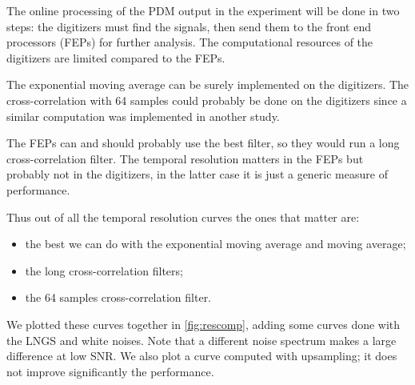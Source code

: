\begin{figure}
    
    

\end{figure}

The online processing of the PDM output in the experiment will be done in two
steps: the digitizers must find the signals, then send them to the front end
processors (FEPs) for further analysis. The computational resources of the
digitizers are limited compared to the FEPs.

The exponential moving average can be surely implemented on the digitizers. The
cross-correlation with 64 samples could probably be done on the digitizers
since a similar computation was implemented in another study.

The FEPs can and should probably use the best filter, so they would run a long
cross-correlation filter. The temporal resolution matters in the FEPs but
probably not in the digitizers, in the latter case it is just a generic measure
of performance.

Thus out of all the temporal resolution curves the ones that matter are:
%
\begin{itemize}
    \item the best we can do with the exponential moving average and moving
    average;
    \item the long cross-correlation filters;
    \item the 64 samples cross-correlation filter.
\end{itemize}
%
We plotted these curves together in \autoref{fig:rescomp}, adding some
curves done with the LNGS and white noises. Note that a different noise
spectrum makes a large difference at low SNR. We also plot a curve computed
with upsampling; it does not improve significantly the performance.

\begin{figure}
    
    

\end{figure}

